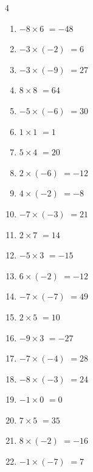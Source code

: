 \begin{multicols}{4}
\begin{enumerate}
  \item $-8\times 6$
        $=-48$

  \item $-3\times (-2)$
        $=6$

\columnbreak %

  \item $-3\times (-9)$
        $=27$

  \item $8\times 8$
        $=64$

  \item $-5\times (-6)$
        $=30$

  \item $1\times 1$
        $=1$

  \item $5\times 4$
        $=20$

  \item $2\times (-6)$
        $=-12$

  \item $4\times (-2)$
        $=-8$

  \item $-7\times (-3)$
        $=21$

  \item $2\times 7$
        $=14$

  \item $-5\times 3$
        $=-15$

  \item $6\times (-2)$
        $=-12$

  \item $-7\times (-7)$
        $=49$

  \item $2\times 5$
        $=10$

  \item $-9\times 3$
        $=-27$

  \item $-7\times (-4)$
        $=28$

  \item $-8\times (-3)$
        $=24$

  \item $-1\times 0$
        $=0$

  \item $7\times 5$
        $=35$

  \item $8\times (-2)$
        $=-16$

  \item $-1\times (-7)$
        $=7$


\end{enumerate}
\end{multicols}
